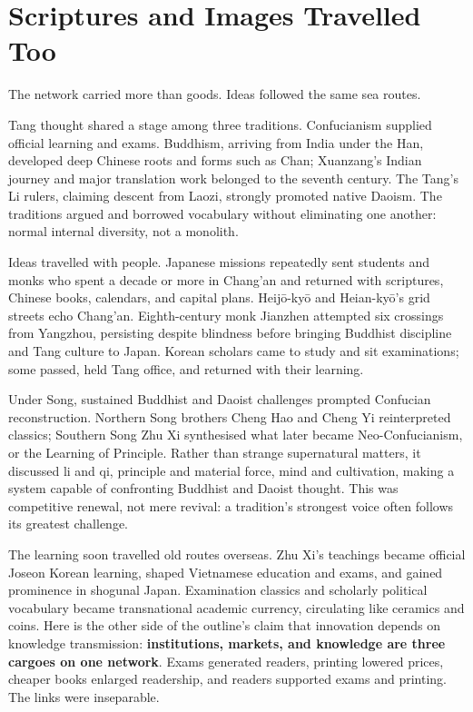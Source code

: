\section{Scriptures and Images Travelled Too}
The network carried more than goods. Ideas followed the same sea routes.

Tang thought shared a stage among three traditions. Confucianism supplied official learning and exams. Buddhism, arriving from India under the Han, developed deep Chinese roots and forms such as Chan; Xuanzang's Indian journey and major translation work belonged to the seventh century. The Tang's Li rulers, claiming descent from Laozi, strongly promoted native Daoism. The traditions argued and borrowed vocabulary without eliminating one another: normal internal diversity, not a monolith.

Ideas travelled with people. Japanese missions repeatedly sent students and monks who spent a decade or more in Chang'an and returned with scriptures, Chinese books, calendars, and capital plans. Heijō-kyō and Heian-kyō's grid streets echo Chang'an. Eighth-century monk Jianzhen attempted six crossings from Yangzhou, persisting despite blindness before bringing Buddhist discipline and Tang culture to Japan. Korean scholars came to study and sit examinations; some passed, held Tang office, and returned with their learning.

Under Song, sustained Buddhist and Daoist challenges prompted Confucian reconstruction. Northern Song brothers Cheng Hao and Cheng Yi reinterpreted classics; Southern Song Zhu Xi synthesised what later became Neo-Confucianism, or the Learning of Principle. Rather than strange supernatural matters, it discussed li and qi, principle and material force, mind and cultivation, making a system capable of confronting Buddhist and Daoist thought. This was competitive renewal, not mere revival: a tradition's strongest voice often follows its greatest challenge.

The learning soon travelled old routes overseas. Zhu Xi's teachings became official Joseon Korean learning, shaped Vietnamese education and exams, and gained prominence in shogunal Japan. Examination classics and scholarly political vocabulary became transnational academic currency, circulating like ceramics and coins. Here is the other side of the outline's claim that innovation depends on knowledge transmission: \textbf{institutions, markets, and knowledge are three cargoes on one network}. Exams generated readers, printing lowered prices, cheaper books enlarged readership, and readers supported exams and printing. The links were inseparable.

